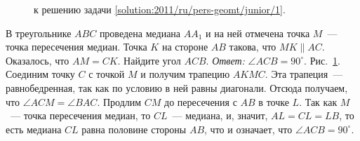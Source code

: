 \ifsolution
\begin{figure}\centering
    \caption{к решению задачи \ref{solution:2011/ru/pers-geomt/junior/1}.}
    \label{fig:solution:2011/ru/pers-geomt/junior/1}
\end{figure}%
\fi %

\problem
В треугольнике $ABC$ проведена медиана $A A_1$ и на ней отмечена точка $M$~---
точка пересечения медиан.
Точка $K$ на стороне $AB$ такова, что $MK \parallel AC$.
Оказалось, что $AM = CK$.
Найдите угол $ACB$.
\solution
\label{solution:2011/ru/pers-geomt/junior/1}%
\emph{Ответ:} $\angle ACB = 90^\circ$.
Рис.~\ref{fig:solution:2011/ru/pers-geomt/junior/1}.
Соединим точку $C$ с точкой $M$ и получим трапецию $AKMC$.
Эта трапеция~--- равнобедренная, так как по условию в ней равны диагонали.
Отсюда получаем, что $\angle ACM = \angle BAC$.
Продлим $CM$ до пересечения с $AB$ в точке $L$.
Так как $M$~--- точка пересечения медиан, то $CL$~--- медиана, и, значит,
$AL = CL = LB$, то есть медиана $CL$ равна половине стороны $AB$, что и
означает, что $\angle ACB = 90^\circ$.
\endproblem
